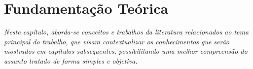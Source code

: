\chapter{Fundamentação Teórica}
\label{cap:02}

\textit{Neste capítulo, aborda-se conceitos e trabalhos da literatura relacionados ao tema principal do trabalho, que visam contextualizar os conhecimentos que serão mostrados em capítulos subsequentes, possibilitando uma melhor compreensão do assunto tratado de forma simples e objetiva.} \\

